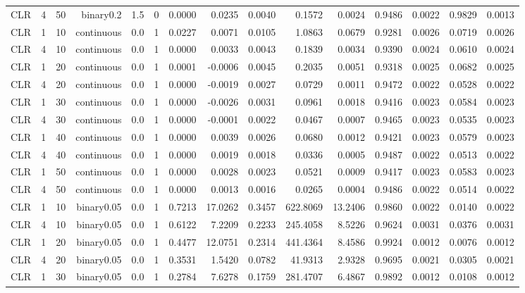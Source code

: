 \begin{longtable}{rrrrrrrrrrrrrrr}
  CLR & 4 & 50 & binary0.2 & 1.5 & 0 & 0.0000 & 0.0235 & 0.0040 & 0.1572 & 0.0024 & 0.9486 & 0.0022 & 0.9829 & 0.0013 \\ 
  CLR & 1 & 10 & continuous & 0.0 & 1 & 0.0227 & 0.0071 & 0.0105 & 1.0863 & 0.0679 & 0.9281 & 0.0026 & 0.0719 & 0.0026 \\ 
  CLR & 4 & 10 & continuous & 0.0 & 1 & 0.0000 & 0.0033 & 0.0043 & 0.1839 & 0.0034 & 0.9390 & 0.0024 & 0.0610 & 0.0024 \\ 
  CLR & 1 & 20 & continuous & 0.0 & 1 & 0.0001 & -0.0006 & 0.0045 & 0.2035 & 0.0051 & 0.9318 & 0.0025 & 0.0682 & 0.0025 \\ 
  CLR & 4 & 20 & continuous & 0.0 & 1 & 0.0000 & -0.0019 & 0.0027 & 0.0729 & 0.0011 & 0.9472 & 0.0022 & 0.0528 & 0.0022 \\ 
  CLR & 1 & 30 & continuous & 0.0 & 1 & 0.0000 & -0.0026 & 0.0031 & 0.0961 & 0.0018 & 0.9416 & 0.0023 & 0.0584 & 0.0023 \\ 
  CLR & 4 & 30 & continuous & 0.0 & 1 & 0.0000 & -0.0001 & 0.0022 & 0.0467 & 0.0007 & 0.9465 & 0.0023 & 0.0535 & 0.0023 \\ 
  CLR & 1 & 40 & continuous & 0.0 & 1 & 0.0000 & 0.0039 & 0.0026 & 0.0680 & 0.0012 & 0.9421 & 0.0023 & 0.0579 & 0.0023 \\ 
  CLR & 4 & 40 & continuous & 0.0 & 1 & 0.0000 & 0.0019 & 0.0018 & 0.0336 & 0.0005 & 0.9487 & 0.0022 & 0.0513 & 0.0022 \\ 
  CLR & 1 & 50 & continuous & 0.0 & 1 & 0.0000 & 0.0028 & 0.0023 & 0.0521 & 0.0009 & 0.9417 & 0.0023 & 0.0583 & 0.0023 \\ 
  CLR & 4 & 50 & continuous & 0.0 & 1 & 0.0000 & 0.0013 & 0.0016 & 0.0265 & 0.0004 & 0.9486 & 0.0022 & 0.0514 & 0.0022 \\ 
  CLR & 1 & 10 & binary0.05 & 0.0 & 1 & 0.7213 & 17.0262 & 0.3457 & 622.8069 & 13.2406 & 0.9860 & 0.0022 & 0.0140 & 0.0022 \\ 
  CLR & 4 & 10 & binary0.05 & 0.0 & 1 & 0.6122 & 7.2209 & 0.2233 & 245.4058 & 8.5226 & 0.9624 & 0.0031 & 0.0376 & 0.0031 \\ 
  CLR & 1 & 20 & binary0.05 & 0.0 & 1 & 0.4477 & 12.0751 & 0.2314 & 441.4364 & 8.4586 & 0.9924 & 0.0012 & 0.0076 & 0.0012 \\ 
  CLR & 4 & 20 & binary0.05 & 0.0 & 1 & 0.3531 & 1.5420 & 0.0782 & 41.9313 & 2.9328 & 0.9695 & 0.0021 & 0.0305 & 0.0021 \\ 
  CLR & 1 & 30 & binary0.05 & 0.0 & 1 & 0.2784 & 7.6278 & 0.1759 & 281.4707 & 6.4867 & 0.9892 & 0.0012 & 0.0108 & 0.0012 \\ 

\end{longtable}

